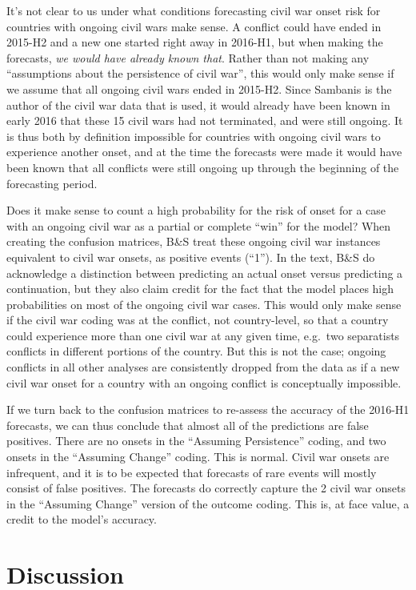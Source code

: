 \documentclass[
]{article}
\begin{document}
It's not clear to us under what conditions forecasting civil war onset risk for countries with ongoing civil wars make sense. A
conflict could have ended in 2015-H2 and a new one started right away in 2016-H1, but when making the forecasts, \emph{we would have already known that}. Rather than not making any ``assumptions about the persistence of civil war'', this would only make sense if we assume that all ongoing civil wars ended in 2015-H2. Since Sambanis is the author of the civil war data that is used, it would already have been known in early 2016 that these 15 civil wars had not terminated, and were still ongoing. It is thus both by definition impossible for countries with ongoing civil wars to experience another onset, and at the time the forecasts were made it would have been known that all conflicts were still ongoing up through the beginning of the forecasting period.

Does it make sense to count a high probability for the risk of onset for a case with an ongoing civil war as a partial or complete ``win'' for the model? When creating the confusion matrices, B\&S treat these ongoing civil war instances equivalent to civil war onsets, as positive events (``1''). In the text, B\&S do acknowledge a distinction between predicting an actual onset versus predicting a continuation, but they also claim credit for the fact that the model places high probabilities on most of the ongoing civil war cases. This would only make sense if the civil war coding was at the conflict, not country-level, so that a country could experience more than one civil war at any given time, e.g.~two separatists conflicts in different portions of the country. But this is not the case; ongoing conflicts in all other analyses are consistently dropped from the data as if a new civil war onset for a country with an ongoing conflict is conceptually impossible.

If we turn back to the confusion matrices to re-assess the accuracy of the 2016-H1 forecasts, we can thus conclude that almost all of the predictions are false positives. There are no onsets in the ``Assuming Persistence'' coding, and two onsets in the ``Assuming Change'' coding. This is normal. Civil war onsets are infrequent, and it is to be expected that forecasts of rare events will mostly consist of false positives. The forecasts do correctly capture the 2 civil war onsets in the ``Assuming Change'' version of the outcome coding. This is, at face value, a credit to the model's accuracy.

\hypertarget{discussion}{%
\section{Discussion}\label{discussion}}
\end{document}
